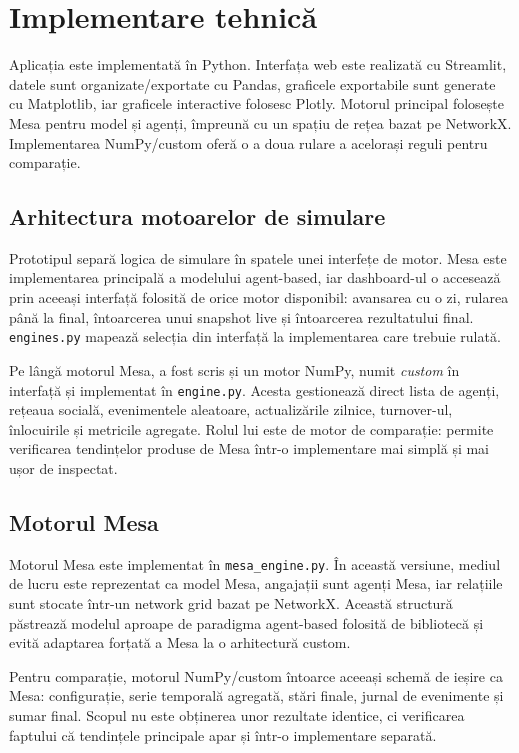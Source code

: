 \documentclass[12pt,a4paper]{article}
\begin{document}
\clearpage
\section{Implementare tehnică}

Aplicația este implementată în Python. Interfața web este realizată cu Streamlit, datele sunt organizate/exportate cu Pandas, graficele exportabile sunt generate cu Matplotlib, iar graficele interactive folosesc Plotly. Motorul principal folosește Mesa pentru model și agenți, împreună cu un spațiu de rețea bazat pe NetworkX. Implementarea NumPy/custom oferă o a doua rulare a acelorași reguli pentru comparație.

\subsection{Arhitectura motoarelor de simulare}

Prototipul separă logica de simulare în spatele unei interfețe de motor. Mesa este implementarea principală a modelului agent-based, iar dashboard-ul o accesează prin aceeași interfață folosită de orice motor disponibil: avansarea cu o zi, rularea până la final, întoarcerea unui snapshot live și întoarcerea rezultatului final. \texttt{engines.py} mapează selecția din interfață la implementarea care trebuie rulată.

Pe lângă motorul Mesa, a fost scris și un motor NumPy, numit \textit{custom} în interfață și implementat în \texttt{engine.py}. Acesta gestionează direct lista de agenți, rețeaua socială, evenimentele aleatoare, actualizările zilnice, turnover-ul, înlocuirile și metricile agregate. Rolul lui este de motor de comparație: permite verificarea tendințelor produse de Mesa într-o implementare mai simplă și mai ușor de inspectat.

\subsection{Motorul Mesa}

Motorul Mesa este implementat în \texttt{mesa\_engine.py}. În această versiune, mediul de lucru este reprezentat ca model Mesa, angajații sunt agenți Mesa, iar relațiile sunt stocate într-un network grid bazat pe NetworkX. Această structură păstrează modelul aproape de paradigma agent-based folosită de bibliotecă și evită adaptarea forțată a Mesa la o arhitectură custom.

Pentru comparație, motorul NumPy/custom întoarce aceeași schemă de ieșire ca Mesa: configurație, serie temporală agregată, stări finale, jurnal de evenimente și sumar final. Scopul nu este obținerea unor rezultate identice, ci verificarea faptului că tendințele principale apar și într-o implementare separată.
\end{document}
